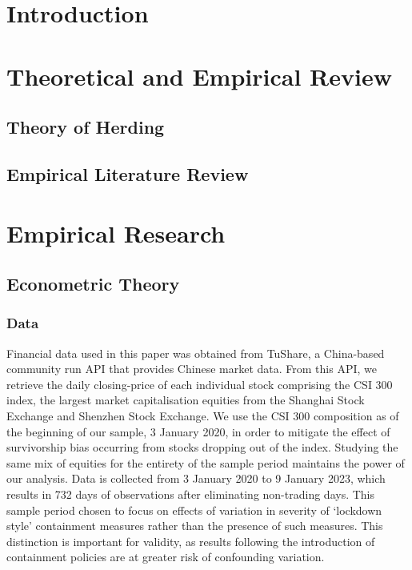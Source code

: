 \documentclass[12pt]{article}
\begin{document}


\tableofcontents

\break

\section{Introduction}

\break

\section{Theoretical and Empirical Review}

\subsection{Theory of Herding}



\subsection{Empirical Literature Review}

\break

\section{Empirical Research}

\subsection{Econometric Theory}

\subsubsection*{Data}

Financial data used in this paper was obtained from TuShare, a China-based community run API that provides Chinese market data. From this API, we retrieve the daily closing-price of each individual stock comprising the CSI 300 index, the largest market capitalisation equities from the Shanghai Stock Exchange and Shenzhen Stock Exchange. We use the CSI 300 composition as of the beginning of our sample, 3 January 2020, in order to mitigate the effect of survivorship bias occurring from stocks dropping out of the index. Studying the same mix of equities for the entirety of the sample period maintains the power of our analysis. Data is collected from 3 January 2020 to 9 January 2023, which results in 732 days of observations after eliminating non-trading days. This sample period chosen to focus on effects of variation in severity of ‘lockdown style’ containment measures rather than the presence of such measures. This distinction is important for validity, as results following the introduction of containment policies are at greater risk of confounding variation.
\end{document}
